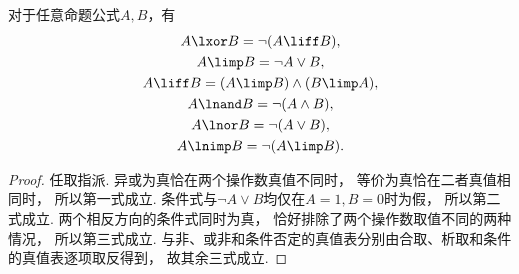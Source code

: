 \begin{theorem}
对于任意命题公式\(A,B\)，有\begin{gather}
	A \lxor B
	= \neg(A \liff B),
		\label{equation:数理逻辑.联结词等值式1} \\
	A \limp B
	= \neg A \lor B,
		\label{equation:数理逻辑.联结词等值式2} \\
	A \liff B
	= (A \limp B) \land (B \limp A),
		\label{equation:数理逻辑.联结词等值式3} \\
	A \lnand B
	= \neg(A \land B),
		\label{equation:数理逻辑.联结词等值式4} \\
	A \lnor B
	= \neg(A \lor B),
		\label{equation:数理逻辑.联结词等值式5} \\
	A \lnimp B
	= \neg(A \limp B).
		\label{equation:数理逻辑.联结词等值式6}
\end{gather}
    \begin{proof}
        任取指派.
        异或为真恰在两个操作数真值不同时，
        等价为真恰在二者真值相同时，
        所以第一式成立.
        条件式与\(\neg A\lor B\)均仅在\(A=1,B=0\)时为假，
        所以第二式成立.
        两个相反方向的条件式同时为真，
        恰好排除了两个操作数取值不同的两种情况，
        所以第三式成立.
        与非、或非和条件否定的真值表分别由合取、析取和条件的真值表逐项取反得到，
        故其余三式成立.
    \end{proof}
\end{theorem}

